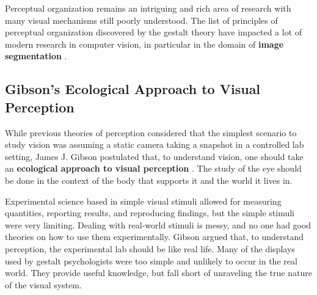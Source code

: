 
Perceptual organization remains an intriguing and rich area of research with many visual mechanisms still poorly understood. The list of principles of perceptual organization discovered by the gestalt theory have impacted a lot of modern research in computer vision, in particular in the domain of {\bf image segmentation} \cite{Malik90}.


\subsection{Gibson's Ecological Approach to Visual Perception}

While previous theories of perception considered that the simplest scenario to study vision was assuming a static camera taking a snapshot in a controlled lab setting, James J. Gibson postulated that, to understand vision, one should take an {\bf ecological approach to visual perception} \cite{Gibson1979}. The study of the eye should be done in the context of the body that supports it and the world it lives in.

Experimental science based in simple visual stimuli allowed for measuring quantities, reporting results, and reproducing findings, but the simple stimuli were very limiting. Dealing with real-world stimuli is messy, and no one had good theories on how to use them experimentally. Gibson argued that, to understand perception, the experimental lab should be like real life. Many of the displays used by gestalt psychologists were too simple and unlikely to occur in the real world. They provide useful knowledge, but fall short of unraveling the true nature of the visual system. 

